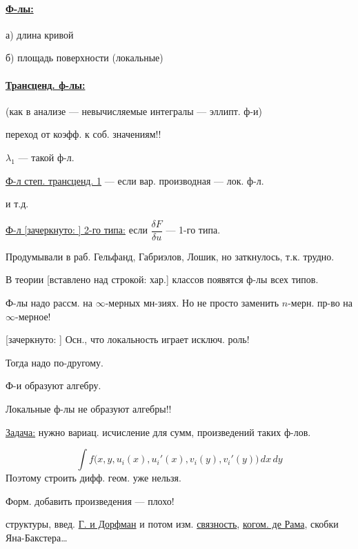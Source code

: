 \paragraph*{\underline{Ф-лы:}}
а) длина кривой

б) площадь поверхности \qquad (локальные)

\paragraph*{\underline{Трансценд. ф-лы:}}
(как в анализе — невычисляемые интегралы — эллипт. ф-и)

переход от коэфф. к соб. значениям!!

$\lambda_1$ — такой ф-л.

\underline{Ф-л степ. трансценд. 1} — если вар. производная — лок. ф-л.

и т.д.

\underline{Ф-л [зачеркнуто: ]
2-го типа:} если $\dfrac{\delta F}{\delta u}$ — 1-го типа.

Продумывали в раб. Гельфанд, Габриэлов, Лошик,
но заткнулось, т.к. трудно.

В теории [вставлено над строкой: хар.] классов появятся ф-лы всех типов.

Ф-лы надо рассм. на $\infty$-мерных мн-зиях. Но не просто
заменить $n$-мерн. пр-во на $\infty$-мерное!

[зачеркнуто: ]
Осн., что локальность играет исключ. роль!

Тогда надо по-другому.

Ф-и образуют алгебру.

Локальные ф-лы не образуют алгебры!!

\underline{Задача:} нужно вариац. исчисление для сумм, произведений
таких ф-лов.


\begin{equation*}
\int f\bigl(x,y,u_i(x),u_i'(x),v_i(y),v_i'(y)\bigr)\,dx\,dy
\end{equation*}
Поэтому строить дифф. геом. уже нельзя.

Форм. добавить произведения — плохо!

\underline{}
структуры, введ. \underline{Г. и Дорфман} и
потом изм. \underline{связность}, \underline{когом. де Рама}, скобки Яна-Бакстера\ldots

